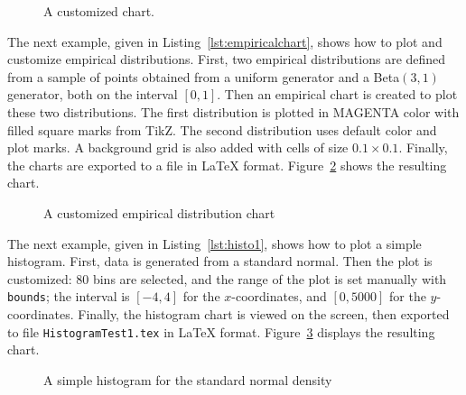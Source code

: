 \begin{latexonly}
\begin{figure}

\caption{A customized chart.\label{fig:customchart-res}}
\end{figure}



The next example, given in Listing~\ref{lst:empiricalchart}, shows how to
plot and customize empirical distributions. First, two empirical distributions
are defined from a sample of points obtained from a uniform
generator and a Beta$(3, 1)$ generator, both on the interval
$[0, 1]$. Then an empirical chart is
created to plot these two distributions. The first distribution is plotted
in MAGENTA color with filled square marks from TikZ. The second distribution
uses default color and plot marks. A background grid is also added with cells
of size $0.1\times 0.1$. Finally, the charts are exported to a file in \LaTeX{} format. Figure~\ref{fig:empiricalchart-res} shows the
resulting chart.





\begin{figure}

\caption{A customized empirical distribution chart\label {fig:empiricalchart-res}}
\end{figure}


The next example, given in Listing~\ref{lst:histo1}, shows how to plot
a simple histogram. First,  data is generated from a standard normal.
 Then the plot is customized: 80 bins are selected, and the range of the
  plot is set manually with \texttt{bounds}; the interval is $[-4, 4]$ for
   the $x$-coordinates, and $[0, 5000]$ for the $y$-coordinates.
 Finally, the histogram chart is viewed on the screen, then exported to
  file \texttt{HistogramTest1.tex} in
\LaTeX{} format.  Figure~\ref{fig:histo1-res} displays the resulting chart.





\begin{figure}

\caption{A simple histogram for the standard normal density\label{fig:histo1-res}}
\end{figure}


\end{latexonly}
